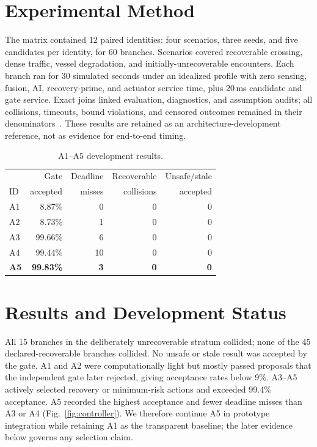 \documentclass[sigconf,nonacm]{acmart}
\begin{document}
\section{Experimental Method}
The matrix contained 12 paired identities: four scenarios, three seeds, and five candidates per identity, for 60 branches. Scenarios covered recoverable crossing, dense traffic, vessel degradation, and initially-unrecoverable encounters. Each branch ran for 30 simulated seconds under an idealized profile with zero sensing, fusion, AI, recovery-prime, and actuator service time, plus 20\,ms candidate and gate service. Exact joins linked evaluation, diagnostics, and assumption audits; all collisions, timeouts, bound violations, and censored outcomes remained in their denominators~\cite{a32}. These results are retained as an architecture-development reference, not as evidence for end-to-end timing.

\begin{table}[b]
\centering
\caption{A1--A5 development results.}
\label{tab:results}
\scriptsize
\begin{tabular}{@{}lrrrr@{}}
\toprule
 & Gate & Deadline & Recoverable & Unsafe/stale\\
ID & accepted & misses & collisions & accepted\\
\midrule
A1 & 8.87\% & 0  & 0 & 0\\
A2 & 8.73\% & 1  & 0 & 0\\
A3 & 99.66\% & 6 & 0 & 0\\
A4 & 99.44\% & 10 & 0 & 0\\
\textbf{A5} & \textbf{99.83\%} & \textbf{3} & \textbf{0} & \textbf{0}\\
\bottomrule
\end{tabular}
\end{table}

\section{Results and Development Status}
All 15 branches in the deliberately unrecoverable stratum collided; none of the 45 declared-recoverable branches collided. No unsafe or stale result was accepted by the gate. A1 and A2 were computationally light but mostly passed proposals that the independent gate later rejected, giving acceptance rates below 9\%. A3--A5 actively selected recovery or minimum-risk actions and exceeded 99.4\% acceptance. A5 recorded the highest acceptance and fewer deadline misses than A3 or A4 (Fig.~\ref{fig:controller}). We therefore continue A5 in prototype integration while retaining A1 as the transparent baseline; the later evidence below governs any selection claim.
\end{document}

